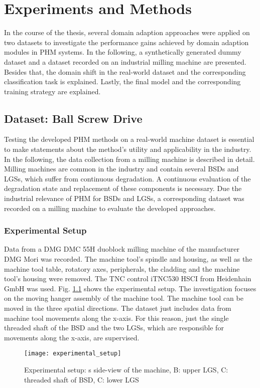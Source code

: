 \chapter{Experiments and Methods}\label{chapter:experiments}
In the course of the thesis, several domain adaption approaches were applied on two datasets to investigate the performance gains achieved by domain adaption modules in PHM systems. In the following, a synthetically generated dummy dataset and a dataset recorded on an industrial milling machine are presented. Besides that, the domain shift in the real-world dataset and the corresponding classification task is explained. Lastly, the final model and the corresponding training strategy are explained.

\section{Dataset: Ball Screw Drive}
Testing the developed PHM methods on a real-world machine dataset is essential to make statements about the method's utility and applicability in the industry. In the following, the data collection from a milling machine is described in detail. Milling machines are common in the industry and contain several BSDs and LGSs, which suffer from continuous degradation. A continuous evaluation of the degradation state and replacement of these components is necessary. Due the industrial relevance of PHM for BSDs and LGSs, a corresponding dataset was recorded on a milling machine to evaluate the developed approaches.

\subsection{Experimental Setup}
Data from a DMG DMC 55H duoblock milling machine of the manufacturer DMG Mori was recorded. The machine tool’s spindle and housing, as well as the machine tool table, rotatory axes, peripherals, the cladding and the machine tool's housing were removed. The TNC control iTNC530 HSCI from Heidenhain GmbH was used. Fig. \ref{fig:experimental_setup} shows the experimental setup. The investigation focuses on the moving hanger assembly of the machine tool. The machine tool can be moved in the three spatial directions. The dataset just includes data from machine tool movements along the x-axis. For this reason, just the single threaded shaft of the BSD and the two LGSs, which are responsible for movements along the x-axis, are supervised.

\begin{figure}[H]
  \centering
  \texttt{[image: experimental\_setup]}
  \caption {Experimental setup: s side-view of the machine, B: upper LGS, C: threaded shaft of BSD, C: lower LGS}
  \label{fig:experimental_setup}
\end{figure}

